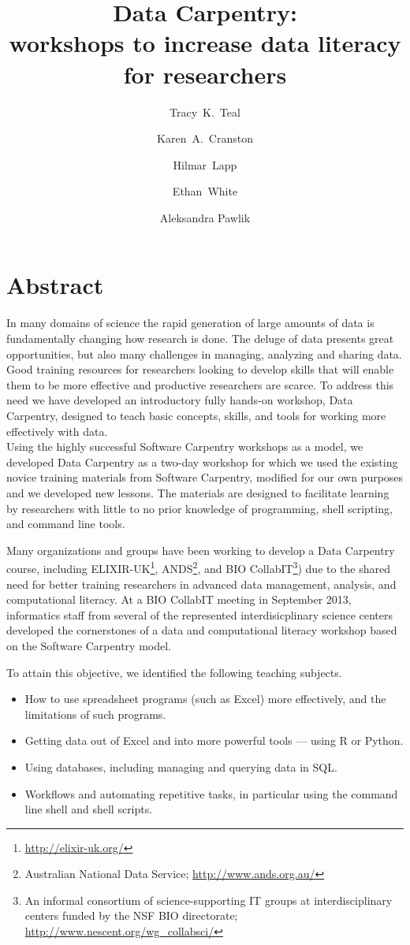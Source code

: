 \documentclass[15]{idcc}
\title[Data Carpentry]{Data Carpentry: \\workshops to increase data literacy for researchers}
\author{Tracy~K.~Teal}
\affil{Michigan State University, East Lansing, MI, USA}
\author{Karen~A.~Cranston}
\affil{National Evolutionary Synthesis Center (NESCent), Durham, NC, USA}
\author{Hilmar~Lapp}
\affil{National Evolutionary Synthesis Center (NESCent), Durham, NC, USA}
\author{Ethan~White}
\affil{Utah State University, Logan, UT, USA}
\author{Aleksandra Pawlik}
\affil{University of Manchester, United Kingdom}
\begin{document}
\maketitle



\section{Abstract}
In many domains of science the rapid generation of large amounts of data is fundamentally changing how research is done. The deluge of data presents great opportunities, but also many challenges in managing, analyzing and sharing data. Good training resources for researchers looking to develop skills that will enable them to be more effective and productive researchers are scarce. To address this need we have developed an introductory fully hands-on workshop, Data Carpentry, designed to teach basic concepts, skills, and tools for working more effectively with data.\\

Using the highly successful Software Carpentry workshops as a model, we developed Data Carpentry as a two-day workshop for which we used the existing novice training materials from Software Carpentry, modified for our own purposes and we developed new lessons. The materials are designed to facilitate learning by researchers with little to no prior knowledge of programming, shell scripting, and command line tools.


Many organizations and groups have been working to develop a Data Carpentry course, including ELIXIR-UK\footnote{\url{http://elixir-uk.org/}}, ANDS\footnote{Australian National Data Service; \url{http://www.ands.org.au/}}, and BIO CollabIT\footnote{An   informal consortium of science-supporting IT groups at interdisciplinary centers funded by the NSF BIO directorate;  \url{http://www.nescent.org/wg_collabsci/}}) due to the shared need for better training researchers in advanced data management, analysis, and computational literacy.  At a BIO CollabIT meeting in September 2013, informatics staff from several of the represented interdisicplinary science centers developed the cornerstones of a data and computational literacy workshop based on the Software Carpentry model. 


To attain this objective, we identified the following teaching subjects.
\begin{itemize}
\item How to use spreadsheet programs (such as Excel) more effectively, and the limitations of such programs.
\item Getting data out of Excel and into more powerful tools --- using R or Python.
\item Using databases, including managing and querying data in SQL.
\item Workflows and automating repetitive tasks, in particular using the command line shell and shell scripts.
\end{itemize}
\end{document}
